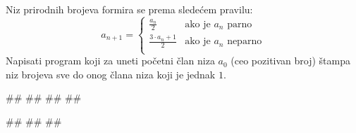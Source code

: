 \begin{Exercise}[difficulty=1, label=v1.3_09] 
Niz prirodnih brojeva formira se prema sledećem pravilu:
\begin{equation*}
a_{n+1} = \left\{
\begin{array}{rl}
\frac{a_n}{2} & \text{ako je } a_n \text{ parno}\\
\frac{3\cdot a_n + 1}{2} & \text{ako je } a_n \text{ neparno}\\
\end{array} \right.
\end{equation*}
Napisati program koji za uneti početni član niza $a_0$ (ceo pozitivan
broj) štampa niz brojeva sve do onog člana niza koji je jednak $1$. 


\begin{miditest}
\begin{upotreba}{1}
#\naslovInt#
##
##
##
\end{upotreba}
\end{miditest}
\begin{miditest}
\begin{upotreba}{2}
#\naslovInt#
##
##
\end{upotreba}
\end{miditest}
\end{Exercise}
\begin{Answer}[ref=v1.3_09]
\end{Answer}


